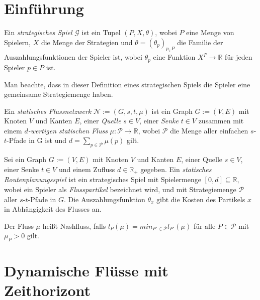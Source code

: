 \section{Einführung}\label{introduction}

\newcommand{\R}{\mathbb{R}}
\newcommand{\Q}{\mathbb{Q}}

\begin{definition}
	Ein \emph{strategisches Spiel} $\mathcal{G}$ ist ein Tupel $(P, X, \theta)$, wobei $P$ eine Menge von Spielern, $X$ die Menge der Strategien  und $\theta=(\theta_p)_{p_\in P}$ die Familie der Auszahlungsfunktionen der Spieler ist, wobei $\theta_p$ eine Funktion $X^P\to\R$ für jeden Spieler $p\in P$ ist.
\end{definition}

Man beachte, dass in dieser Definition eines strategischen Spiels die Spieler eine gemeinsame Strategiemenge haben.

\begin{definition}
	Ein \emph{statisches Flussnetzwerk} $\mathcal{N}:=(G,s,t,\mu)$ ist ein Graph $G:=(V,E)$ mit Knoten $V$ und Kanten $E$, einer \emph{Quelle} $s\in V$, einer \emph{Senke} $t\in V$ zusammen mit einem \emph{$d$-wertigen statischen Fluss} $\mu: \mathcal{P} \to \R$, wobei $\mathcal{P}$ die Menge aller einfachen $s$-$t$-Pfade in G ist und $d=\sum_{p\in\mathcal{P}}\mu(p)$ gilt.
\end{definition}

\begin{definition}
	Sei ein Graph $G:=(V,E)$ mit Knoten $V$ und Kanten $E$, einer Quelle $s\in V$, einer Senke $t\in V$ und einem Zufluss $d\in\R_+$ gegeben.
	Ein \emph{statisches Routenplanungsspiel} ist ein strategisches Spiel mit  Spielermenge $[0,d]\subseteq\R$, wobei ein Spieler als \emph{Flusspartikel} bezeichnet wird, und mit Strategiemenge $\mathcal{P}$ aller $s$-$t$-Pfade in $G$.
	Die Auszahlungsfunktion $\theta_x$ gibt die Kosten des Partikels $x$ in Abhängigkeit des Flusses an.
	
	Der Fluss $\mu$ heißt Nashfluss, falls $l_P(\mu)=min_{P'\in\mathcal{P}}l_{P'}(\mu)$ für alle $P\in\mathcal{P}$ mit $\mu_P > 0$ gilt.
\end{definition}

\section{Dynamische Flüsse mit Zeithorizont}


